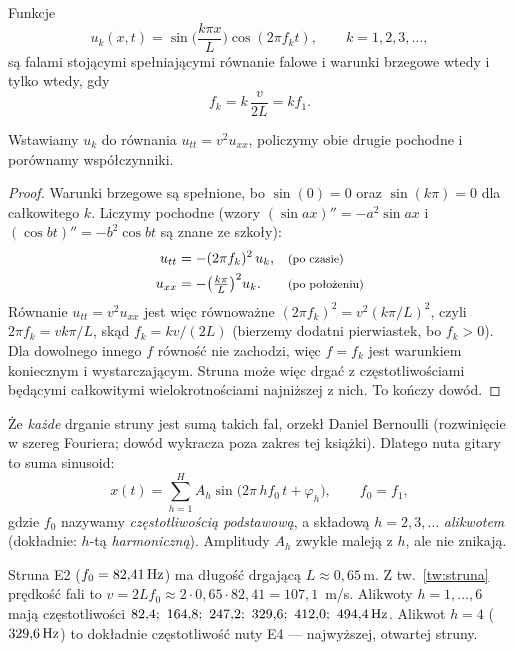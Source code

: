 \begin{twierdzenie}\label{tw:struna}
Funkcje
\[u_k(x,t)=\sin\!\Big(\frac{k\pi x}{L}\Big)\cos(2\pi f_k t),\qquad k=1,2,3,\dots,\]
są falami stojącymi spełniającymi równanie falowe i warunki brzegowe wtedy i tylko wtedy, gdy
\begin{equation}
  f_k = k\,\frac{v}{2L}=k f_1 .
\end{equation}
\end{twierdzenie}
\begin{pomyslDowodu}
Wstawiamy $u_k$ do równania $u_{tt}=v^2u_{xx}$, policzymy obie drugie pochodne i porównamy współczynniki.
\end{pomyslDowodu}
\begin{proof}
Warunki brzegowe są spełnione, bo $\sin(0)=0$ oraz $\sin(k\pi)=0$ dla całkowitego $k$. Liczymy pochodne (wzory
$(\sin ax)''=-a^2\sin ax$ i $(\cos bt)''=-b^2\cos bt$ są znane ze szkoły):
\begin{align*}
u_{tt} &= -(2\pi f_k)^2\,u_k, && \text{\footnotesize (po czasie)}\\
u_{xx} &= -\big(\tfrac{k\pi}{L}\big)^2u_k. && \text{\footnotesize (po położeniu)}
\end{align*}
Równanie $u_{tt}=v^2u_{xx}$ jest więc równoważne $(2\pi f_k)^2=v^2(k\pi/L)^2$, czyli $2\pi f_k=vk\pi/L$, skąd
$f_k=kv/(2L)$ (bierzemy dodatni pierwiastek, bo $f_k>0$). Dla dowolnego innego $f$ równość nie zachodzi, więc
$f=f_k$ jest warunkiem koniecznym i wystarczającym. Struna może więc drgać z częstotliwościami będącymi całkowitymi
wielokrotnościami najniższej z nich. To kończy dowód.
\end{proof}

Że \emph{każde} drganie struny jest sumą takich fal, orzekł Daniel Bernoulli (rozwinięcie w szereg Fouriera; dowód
wykracza poza zakres tej książki). Dlatego nuta gitary to suma sinusoid:
\begin{equation}
  x(t)=\sum_{h=1}^{H}A_h\sin\big(2\pi\,h f_0\,t+\varphi_h\big),\qquad f_0=f_1,
  \label{eq:szereg-harm}
\end{equation}
gdzie $f_0$ nazywamy \emph{częstotliwością podstawową}, a składową $h=2,3,\dots$ \emph{alikwotem} (dokładnie:
$h$-tą \emph{harmoniczną}). Amplitudy $A_h$ zwykle maleją z $h$, ale nie znikają.

\begin{przyklad}\label{prz:alik-e2}
Struna E2 ($f_0=82{,}41\,\mathrm{Hz}$) ma długość drgającą $L\approx0{,}65\,$m. Z tw.~\ref{tw:struna} prędkość fali to
$v=2Lf_0\approx 2\cdot0{,}65\cdot82{,}41=107{,}1$~m/s. Alikwoty $h=1,\dots,6$ mają częstotliwości
$82{,}4;\ 164{,}8;\ 247{,}2;\ 329{,}6;\ 412{,}0;\ 494{,}4\Hz$. Alikwot $h=4$ ($329{,}6\,\mathrm{Hz}$) to dokładnie
częstotliwość nuty E4 --- najwyższej, otwartej struny.
\end{przyklad}


